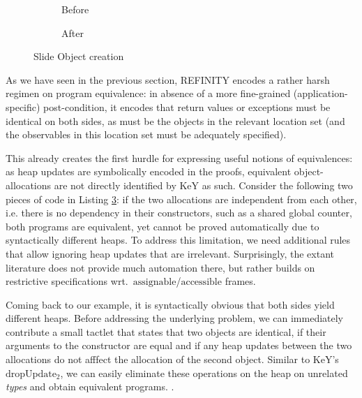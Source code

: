 \newcommand\relevant{$\mathrm{relevant}$}
\newcommand\assignable{$\mathrm{assignable}$}
\newcommand\accessible{$\mathrm{accessible}$}
\newcommand\keyrule[1]{\ensuremath{\mathrm{#1}}}

\begin{figure}
  \begin{subfigure}[h]{.45\linewidth}
    
    \caption{Before}
    \label{lst:ObjectCreation-refinity-before}    
  \end{subfigure}\hspace{1cm}
  \begin{subfigure}[h]{.45\linewidth}
    
    \caption{After}
    \label{lst:ObjectCreation-refinity-after}
  \end{subfigure}
  \caption{Slide Object creation}
  \label{lst:ObjectCreation-refinity}
\end{figure}

As we have seen in the previous section, REFINITY encodes a rather harsh regimen on program equivalence:
in absence of a more fine-grained (application-specific) post-condition, it encodes that return values or exceptions must be identical on both sides,
as must be the objects in the \relevant{} location set (and the observables in this location set must be adequately specified).

This already creates the first hurdle for expressing useful notions of equivalences: as heap updates are symbolically encoded in the proofs, equivalent object-allocations are not directly identified by KeY as such.
Consider the following two pieces of code in Listing \ref{lst:ObjectCreation-refinity}:
if the two allocations are independent from each other, i.e. there is no dependency in their constructors, such as a shared global counter,
both programs are equivalent, yet cannot be proved automatically due to syntactically different heaps.
To address this limitation, we need additional rules that allow ignoring heap updates that are irrelevant.
Surprisingly, the extant literature does not provide much automation there, but rather builds on restrictive specifications wrt.\ \assignable{}/\accessible{} frames.

Coming back to our example, it is syntactically obvious that both sides yield different heaps.
Before addressing the underlying problem, 
we can immediately contribute a small tactlet that states that two objects are identical, if their arguments to the constructor are equal and if any heap updates between the two allocations do not afffect the allocation of the second object.
Similar to KeY's \keyrule{dropUpdate_2}, we can easily eliminate these operations on the heap on unrelated \textit{types} and obtain equivalent programs.
.

